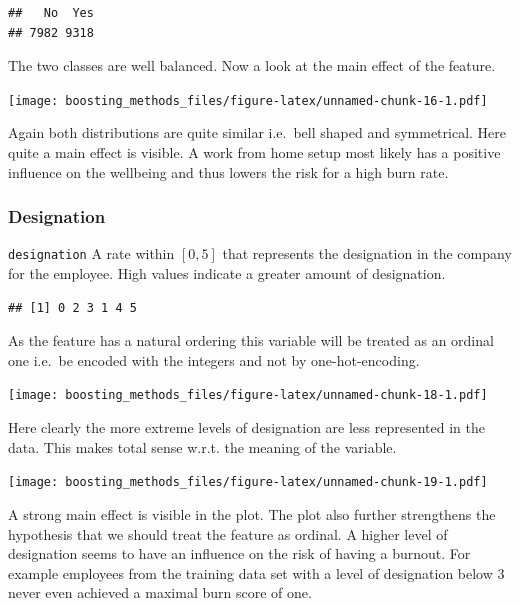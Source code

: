 \documentclass[
]{book}
\newenvironment{Shaded}{\begin{snugshade}}{\end{snugshade}}
\newcommand{\CommentTok}[1]{\textcolor[rgb]{0.56,0.35,0.01}{\textit{#1}}}
\newcommand{\FunctionTok}[1]{\textcolor[rgb]{0.00,0.00,0.00}{#1}}
\newcommand{\NormalTok}[1]{#1}
\newcommand{\SpecialCharTok}[1]{\textcolor[rgb]{0.00,0.00,0.00}{#1}}
\begin{document}
\begin{verbatim}
##   No  Yes 
## 7982 9318
\end{verbatim}

The two classes are well balanced. Now a look at the main effect of the feature.

\texttt{[image: boosting\_methods\_files/figure-latex/unnamed-chunk-16-1.pdf]}

Again both distributions are quite similar i.e.~bell shaped and symmetrical. Here quite a main effect is visible. A work from home setup most likely has a positive influence on the wellbeing and thus lowers the risk for a high burn rate.

\hypertarget{designation}{%
\subsubsection{Designation}\label{designation}}

\texttt{designation} A rate within \([0,5]\) that represents the designation in the company for the employee. High values indicate a greater amount of designation.

\begin{Shaded}
\end{Shaded}

\begin{verbatim}
## [1] 0 2 3 1 4 5
\end{verbatim}

As the feature has a natural ordering this variable will be treated as an ordinal one i.e.~be encoded with the integers and not by one-hot-encoding.

\texttt{[image: boosting\_methods\_files/figure-latex/unnamed-chunk-18-1.pdf]}

Here clearly the more extreme levels of designation are less represented in the data. This makes total sense w.r.t. the meaning of the variable.

\texttt{[image: boosting\_methods\_files/figure-latex/unnamed-chunk-19-1.pdf]}

A strong main effect is visible in the plot. The plot also further strengthens the hypothesis that we should treat the feature as ordinal. A higher level of designation seems to have an influence on the risk of having a burnout. For example employees from the training data set with a level of designation below 3 never even achieved a maximal burn score of one.
\end{document}
